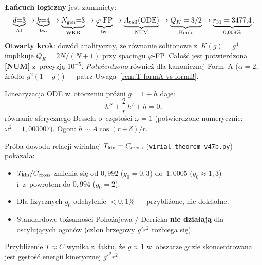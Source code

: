 \begin{remark}[Status O-L5 po v47b]%
\label{rem:T-OL5-v47b}
\textbf{\L{}a\'ncuch logiczny} jest zamkni\k{e}ty:
\[
  \underbrace{d{=}3}_{\text{A1}} \to
  \underbrace{k{=}4}_{\text{tw.}} \to
  \underbrace{N_{\rm gen}{=}3}_{\text{WKB}} \to
  \underbrace{\varphi\text{-FP}}_{\text{tw.}} \to
  \underbrace{A_{\rm tail}(\text{ODE})}_{\text{NUM}} \to
  \underbrace{Q_K = 3/2}_{\text{Koide}} \to
  \underbrace{r_{31} = 3477{,}4}_{\text{0,009\%}}.
\]
\textbf{Otwarty krok}: dowód analityczny, \.ze r\'ownanie solitonowe
z~$K(g) = g^4$ implikuje $Q_K = 2N/(N{+}1)$ przy spacingu $\varphi$-FP.
Ca\l{}o\'s\'c jest potwierdzona \textbf{[NUM]} z~precyzj\k{a} $10^{-5}$.
\emph{Potwierdzono} r\'ownie\.z dla kanonicznej Form~A ($\alpha = 2$,
\'zr\'od\l{}o $g^2(1-g)$) --- patrz Uwaga~\ref{rem:T-formA-vs-formB}.
\end{remark}

\begin{remark}%
\label{rem:T-oscillatory-tail}
Linearyzacja ODE w~otoczeniu pr\'o\.zni $g = 1 + h$ daje:
\[
  h'' + \frac{2}{r}\,h' + h = 0,
\]
r\'ownanie sferycznego Bessela o~cz\k{e}sto\'sci $\omega = 1$ (potwierdzone
numerycznie: $\omega^2 = 1{,}000007$). Ogon: $h \sim A\cos(r + \delta)/r$.

Pr\'oba dowodu relacji wirialnej $T_{\rm kin} = C_{\rm cross}$
(\texttt{virial\_theorem\_v47b.py}) pokaza\l{}a:
\begin{itemize}[nosep]
  \item $T_{\rm kin}/C_{\rm cross}$ zmienia si\k{e} od $0{,}992$ ($g_0 = 0{,}3$)
    do~$1{,}0005$ ($g_0 \approx 1{,}3$) i~z~powrotem do $0{,}994$ ($g_0 = 2$).
  \item Dla fizycznych $g_0$ odchylenie $< 0{,}1\%$ --- przybli\.zone, nie dok\l{}adne.
  \item Standardowe to\.zsamo\'sci Pohożajewa / Derricka \textbf{nie dzia\l{}aj\k{a}}
    dla oscyluj\k{a}cych ogon\'ow (cz\l{}on brzegowy $g' r^2$ rozbiega si\k{e}).
\end{itemize}
Przybli\.zenie $T \approx C$ wynika z~faktu, \.ze $g \approx 1$ w~obszarze
gdzie skoncentrowana jest g\k{e}sto\'s\'c energii kinetycznej $g'^2 r^2$.
\end{remark}

